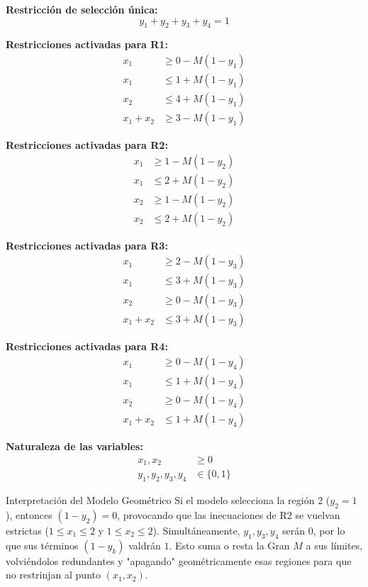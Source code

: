 \documentclass[10pt,a4paper]{article}
\begin{document}
\textbf{Restricción de selección única:}
\[ y_1 + y_2 + y_3 + y_4 = 1 \]

\textbf{Restricciones activadas para R1:}
\begin{align*}
    x_1 &\ge 0 - M(1 - y_1) \\
    x_1 &\le 1 + M(1 - y_1) \\
    x_2 &\le 4 + M(1 - y_1) \\
    x_1 + x_2 &\ge 3 - M(1 - y_1)
\end{align*}

\textbf{Restricciones activadas para R2:}
\begin{align*}
    x_1 &\ge 1 - M(1 - y_2) \\
    x_1 &\le 2 + M(1 - y_2) \\
    x_2 &\ge 1 - M(1 - y_2) \\
    x_2 &\le 2 + M(1 - y_2)
\end{align*}

\textbf{Restricciones activadas para R3:}
\begin{align*}
    x_1 &\ge 2 - M(1 - y_3) \\
    x_1 &\le 3 + M(1 - y_3) \\
    x_2 &\ge 0 - M(1 - y_3) \\
    x_1 + x_2 &\le 3 + M(1 - y_3)
\end{align*}

\textbf{Restricciones activadas para R4:}
\begin{align*}
    x_1 &\ge 0 - M(1 - y_4) \\
    x_1 &\le 1 + M(1 - y_4) \\
    x_2 &\ge 0 - M(1 - y_4) \\
    x_1 + x_2 &\le 1 + M(1 - y_4)
\end{align*}

\textbf{Naturaleza de las variables:}
\begin{align*}
    x_1, x_2 &\ge 0 \\
    y_1, y_2, y_3, y_4 &\in \{0, 1\}
\end{align*}

\begin{nota}{Interpretación del Modelo Geométrico}
Si el modelo selecciona la región 2 ($y_2 = 1$), entonces $(1 - y_2) = 0$, provocando que las inecuaciones de R2 se vuelvan estrictas ($1 \le x_1 \le 2$ y $1 \le x_2 \le 2$). Simultáneamente, $y_1, y_3, y_4$ serán $0$, por lo que sus términos $(1 - y_k)$ valdrán $1$. Esto suma o resta la Gran $M$ a sus límites, volviéndolos redundantes y "apagando" geométricamente esas regiones para que no restrinjan al punto $(x_1, x_2)$.
\end{nota}
\end{document}
